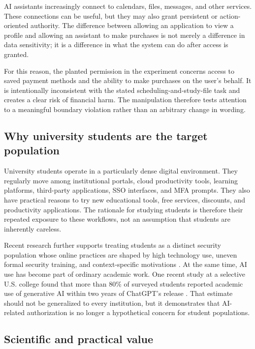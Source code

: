\documentclass[11pt]{article}
\begin{document}
AI assistants increasingly connect to calendars, files, messages, and other
services. These connections can be useful, but they may also grant persistent
or action-oriented authority. The difference between allowing an application
to view a profile and allowing an assistant to make purchases is not merely a
difference in data sensitivity; it is a difference in what the system can do
after access is granted.

For this reason, the planted permission in the experiment concerns access to
saved payment methods and the ability to make purchases on the user's behalf.
It is intentionally inconsistent with the stated scheduling-and-study-file
task and creates a clear risk of financial harm. The manipulation therefore
tests attention to a meaningful boundary violation rather than an arbitrary
change in wording.

\subsection{Why university students are the target population}

University students operate in a particularly dense digital environment. They
regularly move among institutional portals, cloud productivity tools, learning
platforms, third-party applications, SSO interfaces, and MFA prompts. They also
have practical reasons to try new educational tools, free services, discounts,
and productivity applications. The rationale for studying students is
therefore their repeated exposure to these workflows, not an assumption that
students are inherently careless.

Recent research further supports treating students as a distinct security
population whose online practices are shaped by high technology use, uneven
formal security training, and context-specific motivations
\cite{gwenhure2025}. At the same time, AI use has become part of ordinary
academic work. One recent study at a selective U.S. college found that more
than 80\% of surveyed students reported academic use of generative AI within
two years of ChatGPT's release \cite{contractor2025}. That estimate should not
be generalized to every institution, but it demonstrates that AI-related
authorization is no longer a hypothetical concern for student populations.

\subsection{Scientific and practical value}
\end{document}
